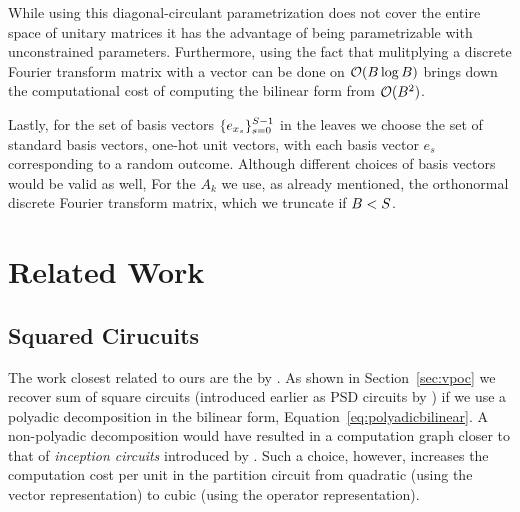 While using this diagonal-circulant parametrization does not cover the entire space of unitary matrices it has the advantage of being parametrizable with unconstrained parameters. Furthermore, using the fact that mulitplying a discrete Fourier transform matrix with a vector can be done on $\mathcal{O}(B \log B)$ brings down the computational cost of computing the bilinear form from $\mathcal{O}(B^2)$.














Lastly,  for the set of  basis vectors $\{e_{x_s} \}_{s=0}^{S-1}$ in the leaves we choose the set of standard basis vectors, \ie one-hot unit vectors, with each basis vector $e_s$ corresponding to a random outcome. Although different choices of basis vectors would be valid as well, For the $A_k$ we use, as already mentioned, the orthonormal discrete Fourier transform matrix, which we truncate if $B<S$.









\section{Related Work}
\label{sec:related}


\subsection{Squared Cirucuits}

The work closest related to ours are the  by \citet{loconte2024sum}.
As shown in Section~\ref{sec:vpoc} we recover sum of square circuits (introduced earlier as PSD circuits by \citet{sladek2023encoding}) if we use a polyadic decomposition in the bilinear form, \cf Equation~\ref{eq:polyadicbilinear}.
A non-polyadic decomposition would have resulted in a computation graph closer to that of \textit{inception circuits} introduced by \citet{wangrelationship}. Such a choice, however, increases the computation cost per unit in the partition circuit from quadratic (using the vector representation) to cubic (using the operator representation).

